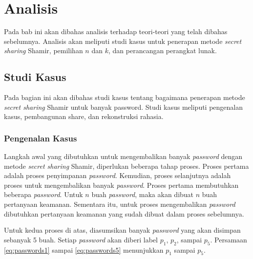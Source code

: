 \chapter{Analisis}
\label{chap:analisis}

Pada bab ini akan dibahas analisis terhadap teori-teori yang telah dibahas sebelumnya. Analisis akan meliputi studi kasus untuk penerapan metode \textit{secret sharing} Shamir, pemilihan \begin{math}n\end{math} dan \begin{math}k\end{math}, dan perancangan perangkat lunak.

\section{Studi Kasus}

Pada bagian ini akan dibahas studi kasus tentang bagaimana penerapan metode \textit{secret sharing} Shamir untuk banyak password. Studi kasus meliputi pengenalan kasus, pembangunan share, dan rekonstruksi rahasia.

\subsection{Pengenalan Kasus}\label{subsec:pengenalankasus}

Langkah awal yang dibutuhkan untuk mengembalikan banyak \textit{password} dengan metode \textit{secret sharing} Shamir, diperlukan beberapa tahap proses. Proses pertama adalah proses penyimpanan \textit{password}. Kemudian, proses selanjutnya adalah proses untuk mengembalikan banyak \textit{password}. Proses pertama membutuhkan beberapa \textit{password}. Untuk \begin{math}n\end{math} buah \textit{password}, maka akan dibuat \begin{math}n\end{math} buah pertanyaan keamanan. Sementara itu, untuk proses mengembalikan \textit{password} dibutuhkan pertanyaan keamanan yang sudah dibuat dalam proses sebelumnya.

Untuk kedua proses di atas, diasumsikan banyak \textit{password} yang akan disimpan sebanyak 5 buah. Setiap \textit{password} akan diberi label \begin{math}p_1\end{math}, \begin{math}p_2\end{math}, sampai \begin{math}p_5\end{math}. Persamaan \ref{eq:passwords1} sampai \ref{eq:passwords5} menunjukkan \begin{math}p_1\end{math} sampai \begin{math}p_5\end{math}.

